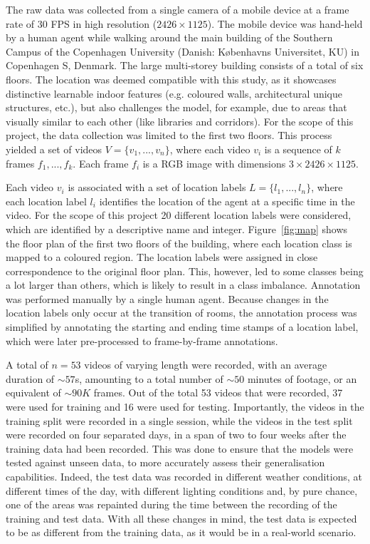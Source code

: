 \documentclass[a4paper]{article}
\begin{document}
The raw data was collected from a single camera of a mobile device at a frame
rate of 30 FPS in high resolution ($2426\times 1125$). The mobile device was
hand-held by a human agent while walking around the main building of the
Southern Campus of the Copenhagen University (Danish: K\o{}benhavns Universitet,
KU) in Copenhagen S, Denmark. The large multi-storey building consists of a
total of six floors. The location was deemed compatible with this study, as it
showcases distinctive learnable indoor features (e.g. coloured walls,
architectural unique structures, etc.), but also challenges the model, for
example, due to areas that visually similar to each other (like libraries and
corridors). For the scope of this project, the data collection was limited to
the first two floors. This process yielded a set of videos $V = \{v_1, ...,
v_n\}$, where each video $v_i$ is a sequence of $k$ frames $f_1, ..., f_k$. Each
frame $f_i$ is a RGB image with dimensions $3 \times 2426 \times 1125$.

Each video $v_i$ is associated with a set of location labels $L = \{l_1, ...,
l_n\}$, where each location label $l_i$ identifies the location of the agent at
a specific time in the video. For the scope of this project 20 different
location labels were considered, which are identified by a descriptive name and
integer. Figure~\ref{fig:map} shows the floor plan of the first two floors of
the building, where each location class is mapped to a coloured region. The
location labels were assigned in close correspondence to the original floor
plan. This, however, led to some classes being a lot larger than others, which
is likely to result in a class imbalance. Annotation was performed manually by a
single human agent. Because changes in the location labels only occur at the
transition of rooms, the annotation process was simplified by annotating the
starting and ending time stamps of a location label, which were later
pre-processed to frame-by-frame annotations. 

A total of $n=53$ videos of varying length were recorded, with an average
duration of $\sim 57$s, amounting to a total number of $\sim 50$ minutes of
footage, or an equivalent of $\sim 90K$ frames. Out of the total 53 videos
that were recorded, 37 were used for training and 16 were used for testing.
Importantly, the videos in the training split were recorded in a single
session, while the videos in the test split were recorded on four separated
days, in a span of two to four weeks after the training data had been
recorded. This was done to ensure that the models were tested against unseen
data, to more accurately assess their generalisation capabilities. Indeed, the 
test data was recorded in different weather conditions, at different times of
the day, with different lighting conditions and, by pure chance, one of the
areas was repainted during the time between the recording of the training and
test data. With all these changes in mind, the test data is expected to be
as different from the training data, as it would be in a real-world scenario.
\end{document}
